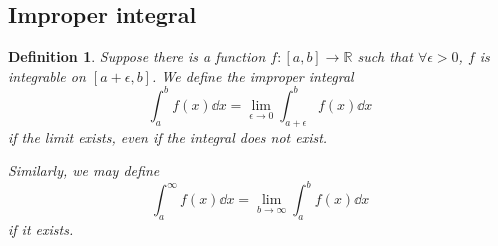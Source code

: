 \documentclass{article}
\theoremstyle{plain}\theoremheaderfont{\normalfont\itshape}\theorembodyfont{\rmfamily}\theoremseparator{.}\newtheorem*{rem}{Remark}\newtheorem*{ex}{Example}\newtheorem*{proof}{Proof}\newtheorem*{altp}{Alternative proof}
\theoremstyle{plain}\theoremheaderfont{\normalfont\bfseries}\theorembodyfont{\rmfamily}\theoremseparator{.}\newtheorem{thm}{Theorem}[section]\newtheorem{lem}[thm]{Lemma}\newtheorem{prop}[thm]{Proposition}\newtheorem*{cor}{Corollary}\newtheorem{defn}[thm]{Definition}\newtheorem{clm}[thm]{Claim}\newtheorem{clminproof}{Claim}
\theoremstyle{break}\theoremheaderfont{\normalfont\itshape}\theorembodyfont{\rmfamily}\theoremseparator{.\medskip}\newtheorem*{proofskip}{Proof}\newtheorem*{exs}{Examples}\newtheorem*{rems}{Remarks}
\theoremstyle{break}\theoremheaderfont{\normalfont\bfseries}\theorembodyfont{\rmfamily}\theoremseparator{.\medskip}\newtheorem{lemskip}[thm]{Lemma}\newtheorem{defnskip}[thm]{Definition}\newtheorem{propskip}[thm]{Proposition}\newtheorem{thmskip}[thm]{Theorem}
\begin{document}
    \subsection{Improper integral}
    \begin{defn}
        Suppose there is a function \(f:[a,b]\to\mathbb{R}\) such that \(\forall\epsilon>0\), \(f\) is integrable on \([a+\epsilon,b]\). We define the \textit{improper integral}
        \[\int_{a}^{b}f(x)\dd{x}=\lim_{\epsilon\to 0}\int_{a+\epsilon}^{b}f(x)\dd{x}\]
        if the limit exists, even if the integral does not exist.

        Similarly, we may define
        \[\int_{a}^{\infty}f(x)\dd{x}=\lim_{b\to\infty}\int_{a}^{b}f(x)\dd{x}\]
        if it exists.
    \end{defn}
\end{document}
